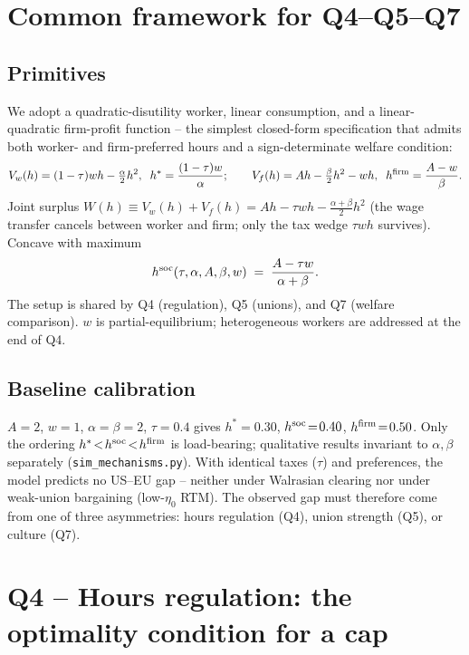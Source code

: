 \documentclass[9pt,a4paper]{extarticle}
\begin{document}
\section{Common framework for Q4--Q5--Q7}

\subsection{Primitives}
We adopt a quadratic-disutility worker, linear consumption, and a
linear-quadratic firm-profit function -- the simplest closed-form
specification that admits both worker- and firm-preferred hours and a
sign-determinate welfare condition:
\[
V_w(h)=(1-\tau)wh-\tfrac{\alpha}{2}h^2,\;\;
h^*=\frac{(1-\tau)w}{\alpha};
\qquad
V_f(h)=Ah-\tfrac{\beta}{2}h^2-wh,\;\;
h^{\rm firm}=\frac{A-w}{\beta}.
\]
Joint surplus $W(h)\!\equiv\!V_w(h)+V_f(h)\!=\!Ah-\tau wh-\tfrac{\alpha+\beta}{2}h^2$
(the wage transfer cancels between worker and firm; only the tax
wedge $\tau wh$ survives). Concave with maximum
\[
h^{\rm soc}(\tau,\alpha,A,\beta,w)\;=\;\frac{A-\tau w}{\alpha+\beta}.
\]
The setup is shared by Q4 (regulation), Q5 (unions), and Q7
(welfare comparison). $w$ is partial-equilibrium; heterogeneous
workers are addressed at the end of Q4.

\subsection{Baseline calibration}
$A=2$, $w=1$, $\alpha=\beta=2$, $\tau=0.4$ gives $h^*\!=\!0.30$,
$h^{\rm soc}\!=\!0.40$, $h^{\rm firm}\!=\!0.50$. Only the ordering
$h^*\!<\!h^{\rm soc}\!<\!h^{\rm firm}$ is load-bearing; qualitative
results invariant to $\alpha,\beta$ separately
(\texttt{sim\_mechanisms.py}). With identical taxes ($\tau$) and
preferences, the model predicts no US--EU gap -- neither under
Walrasian clearing nor under weak-union bargaining (low-$\eta_0$
RTM). The observed gap must therefore come from one of three
asymmetries: hours regulation (Q4), union strength (Q5), or culture
(Q7).

\section{Q4 -- Hours regulation: the optimality condition for a cap}
\end{document}
